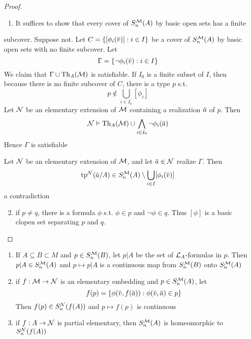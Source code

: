 \documentclass[11pt]{article}
\begin{document}
\begin{proof}
\begin{enumerate}
\item It suffices to show that every cover of \(S_n^{\mathcal{M}}(A)\) by basic open sets has a finite
\end{enumerate}
subcover. Suppose not. Let \(C=\{[\phi_i(\barv)]:i\in I\}\) be a cover of \(S_n^{\mathcal{M}}(A)\) by basic
open sets with no finite subcover. Let
\begin{equation*}
\Gamma=\{\neg\phi_i(\barv):i\in I\}
\end{equation*}
We claim that \(\Gamma\cup\operatorname{Th}_A(\mathcal{M})\) is satisfiable. If \(I_0\) is a finite subset of \(I\), then
because there is no finite subcover of \(C\), there is a type \(p\) s.t.
\begin{equation*}
p\not\in\bigcup_{i\in I_0}[\phi_i]
\end{equation*}
Let \(\mathcal{N}\) be an elementary extension of \(\mathcal{M}\) containing a realization \(\bara\) of \(p\). Then
\begin{equation*}
\caln\vDash\Th_A(\calm)\cup\bigwedge_{i\in I_0}\neg\phi_i(\bara)
\end{equation*}
Hence \(\Gamma\) is satisfiable

Let \(\mathcal{N}\) be an elementary extension of \(\mathcal{M}\), and let \(\bara\in\caln\) realize \(\Gamma\). Then
\begin{equation*}
\tp^{\caln}(\bara/A)\in S_n^{\calm}(A)\setminus\bigcup_{i\in I}[\phi_i(\barv)]
\end{equation*}
a contradiction

\begin{enumerate}
\setcounter{enumi}{1}
\item if \(p\neq q\), there is a formula \(\phi\) s.t. \(\phi\in p\) and \(\neg\phi\in q\). Thus \([\phi]\) is a basic
clopen set separating \(p\) and \(q\).
\end{enumerate}
\end{proof}

\begin{lemma}[]
\label{lemma4.1.9}
\begin{enumerate}
\item If \(A\subseteq B\subset M\) and \(p\in S_n^{\mathcal{M}}(B)\), let \(p|A\) be  the set of \(\mathcal{L}_A\)-formulas in \(p\).
Then \(p|A\in S_n^{\mathcal{M}}(A)\) and \(p\mapsto p|A\) is a continuous map from \(S_n^{\mathcal{M}}(B)\) onto \(S_n^{\mathcal{M}}(A)\)
\item if \(f:\mathcal{M}\to\mathcal{N}\) is an elementary embedding and \(p\in S_n^{\mathcal{M}}(A)\), let
\begin{equation*}
f(p)=\{\phi(\barv,f(\bara)):\phi(\barv,\bara)\in p\}
\end{equation*}
Then \(f(p)\in S_n^{\mathcal{N}}(f(A))\) and \(p\mapsto f(p)\) is continuous
\item if \(f:A\to\mathcal{N}\) is partial elementary, then \(S_n^{\mathcal{M}}(A)\) is homeomorphic to \(S_n^{\mathcal{N}}(f(A))\)
\end{enumerate}
\end{lemma}
\end{document}
